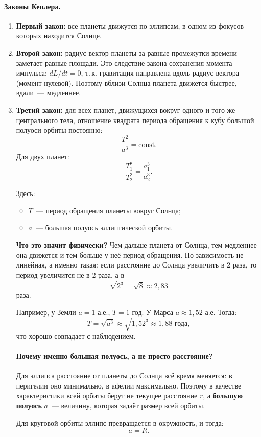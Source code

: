 \documentclass[12pt]{article}
\begin{document}
\paragraph{Законы Кеплера.}

\begin{enumerate}
	\item \textbf{Первый закон:} все планеты движутся по эллипсам, в одном из фокусов которых находится Солнце.
	\item \textbf{Второй закон:} радиус-вектор планеты за равные промежутки времени заметает равные площади. Это следствие закона сохранения момента импульса: $dL/dt = 0$, т.\,к. гравитация направлена вдоль радиус-вектора (момент нулевой). Поэтому вблизи Солнца планета движется быстрее, вдали~--- медленнее.
	\item \textbf{Третий закон:} для всех планет, движущихся вокруг одного и того же центрального тела,
отношение квадрата периода обращения к кубу большой полуоси орбиты постоянно:
    \[
    	\frac{T^2}{a^3} = \text{const}.
    \]
    Для двух планет:
    \[
    	\frac{T_1^2}{T_2^2} = \frac{a_1^3}{a_2^3}.
    \]
    
    Здесь:
    \begin{itemize}
    	\item $T$~--- период обращения планеты вокруг Солнца;
    	\item $a$~--- большая полуось эллиптической орбиты.
    \end{itemize}
    
    \textbf{Что это значит физически?} Чем дальше планета от Солнца, тем медленнее она движется и тем больше у неё период обращения. Но зависимость не линейная, а именно такая:
    если расстояние до Солнца увеличить в 2 раза, то период увеличится не в 2 раза, а в
    \[
    	\sqrt{2^3} = \sqrt{8} \approx 2{,}83
    \]
    раза.
    
    Например, у Земли $a = 1$ а.е., $T = 1$ год. У Марса $a \approx 1{,}52$ а.е. Тогда:
    \[
    	T = \sqrt{a^3} \approx \sqrt{1{,}52^3} \approx 1{,}88 \text{ года},
    \]
    что хорошо совпадает с наблюдением.
    
    \paragraph{Почему именно большая полуось, а не просто расстояние?}
    Для эллипса расстояние от планеты до Солнца всё время меняется:
    в перигелии оно минимально, в афелии максимально.
    Поэтому в качестве характеристики всей орбиты берут не текущее расстояние $r$, а
    \textbf{большую полуось} $a$~--- величину, которая задаёт размер всей орбиты.
    
    Для круговой орбиты эллипс превращается в окружность, и тогда:
    \[
    	a = R.
    \]
\end{enumerate}
\end{document}

